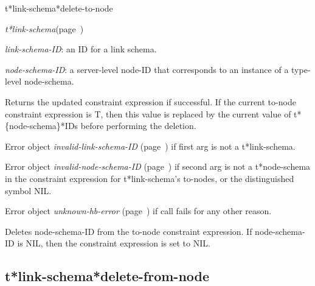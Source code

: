 \begin{description}
\item [Name:]  t*link-schema*delete-to-node

\item [Class:] {\sl t*link-schema}\hfill(page~\pageref{t*link-schema})

\item [Parameters:]
\item {\sl link-schema-ID}:  an ID for a link schema.

\item {\sl node-schema-ID}:  a server-level node-ID that corresponds to an 
instance of a type-level node-schema. 



\item [Return-value:]
Returns the updated constraint expression if successful.
If the current to-node constraint expression is T, 
then this value is replaced by the current value
of t*\{node-schema\}*IDs before performing the deletion.

Error object {\sl invalid-link-schema-ID} (page~\pageref{invalid-link-schema-ID}) if first
arg is not a t*link-schema.

Error object {\sl invalid-node-schema-ID} (page~\pageref{invalid-node-schema-ID}) if second
arg is not a t*node-schema in the constraint 
expression for t*link-schema's to-nodes, or the 
distinguished symbol NIL. 

Error object {\sl unknown-hb-error} (page~\pageref{unknown-hb-error}) if call fails
for any other reason.

\item [Description:]

Deletes node-schema-ID from the to-node constraint
expression. If node-schema-ID is NIL, then the 
constraint expression is set to NIL.

\item [Public:]



\end{description}
\horizontalline

\subsection{t*link-schema*delete-from-node}
\label{t*link-schema*delete-from-node}

